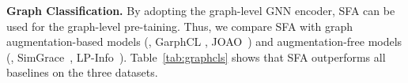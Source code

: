 

%   
%

\vspace{0.1cm}
\noindent\textbf{Graph Classification.}
By adopting the graph-level GNN encoder, SFA can be used for the graph-level pre-taining. %
Thus, we compare SFA with graph augmentation-based models (\ie, GarphCL \citep{DBLP:conf/nips/YouCSCWS20}, JOAO~\citep{DBLP:conf/icml/YouCSW21}) and augmentation-free models (\ie, SimGrace~\cite{DBLP:conf/www/XiaWCHL22}, LP-Info~\cite{DBLP:conf/wsdm/YouCWS22}). Table~\ref{tab:graphcls} shows that SFA outperforms all baselines on the three datasets.

